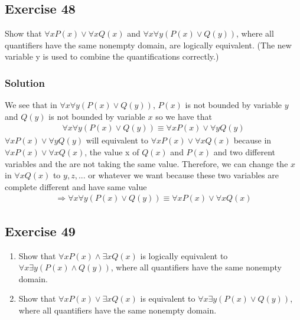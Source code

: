 \documentclass{article}
\begin{document}
\subsection*{Exercise 48}
Show that $\forall xP(x) \lor \forall xQ(x)$ and $\forall x\forall y(P(x) \lor Q(y))$, where all quantifiers have the same nonempty domain, are logically equivalent. (The new variable y is used to combine the quantifications correctly.)
\subsubsection*{Solution}
We see that in $\forall x\forall y(P(x) \lor Q(y))$, $P(x)$ is not bounded by variable $y$ and $Q(y)$ is not bounded by variable $x$ so we have that
\begin{align}
    \forall x\forall y(P(x) \lor Q(y)) \equiv \forall xP(x) \lor \forall yQ(y) \nonumber
\end{align}
$\forall xP(x) \lor \forall yQ(y)$ will equivalent to $\forall xP(x) \lor \forall xQ(x)$ because in $\forall xP(x) \lor \forall xQ(x)$, the value x of $Q(x)$ and $P(x)$ and two different variables and the are not taking the same value. Therefore, we can change the $x$ in $\forall xQ(x)$ to $y, z, ...$ or whatever we want because these two variables are complete different and have same value
\begin{align}
    \Rightarrow \forall x\forall y(P(x) \lor Q(y)) \equiv \forall xP(x) \lor \forall xQ(x) \nonumber
\end{align}
\subsection*{Exercise 49}
\begin{enumerate} [label = (\alph*)]
    \item Show that $\forall xP(x) \land \exists xQ(x)$ is logically equivalent to $\forall x\exists y (P(x) \land Q(y))$, where all quantifiers have the same nonempty domain.
    \item Show that $\forall xP(x) \lor \exists xQ(x)$ is equivalent to $\forall x\exists y(P(x) \lor Q(y))$, where all quantifiers have the same nonempty domain.
\end{enumerate}
\end{document}
